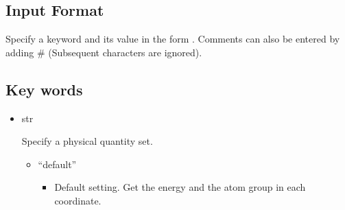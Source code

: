 \documentclass[letterpaper,10pt,english]{sphinxmanual}
\begin{document}
\subsection{Input Format}
\label{\detokenize{file_specification/parameter_observer:input-format}}
Specify a keyword and its value in the form .
Comments can also be entered by adding \# (Subsequent characters are ignored).


\subsection{Key words}
\label{\detokenize{file_specification/parameter_observer:key-words}}\begin{itemize}
\item {} 

 str

Specify a physical quantity set.
\begin{itemize}
\item {} 
“default”
\begin{itemize}
\item {} 
Default setting. Get the energy and the atom group in each coordinate.

\end{itemize}

\end{itemize}

\end{itemize}
\end{document}
